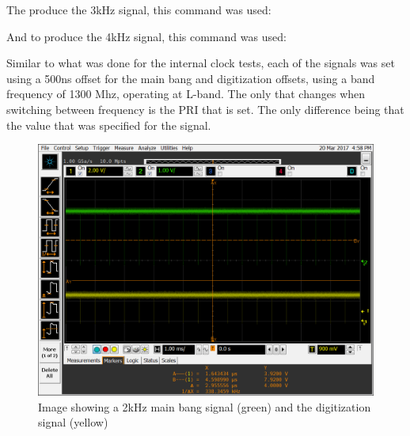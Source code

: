 \documentclass[12pt, a4paper]{article}
\begin{document}
The produce the 3kHz signal, this command was used:


And to produce the 4kHz signal, this command was used:


Similar to what was done for the internal clock tests, each of the signals was set using a 500ns offset for the main bang and digitization offsets, using a band frequency of 1300 Mhz, operating at L-band. The only that changes when switching between frequency is the PRI that is set. The only difference being that the value that was specified for the signal.


	\begin{figure}[t]
		\centering
		\includegraphics[width=13cm]{2khz_ext_500ns}
		\caption{Image showing a 2kHz main bang signal (green) and the digitization signal (yellow)}
		\label{fig:2khz_ext_sig}
	\end{figure}
\end{document}
